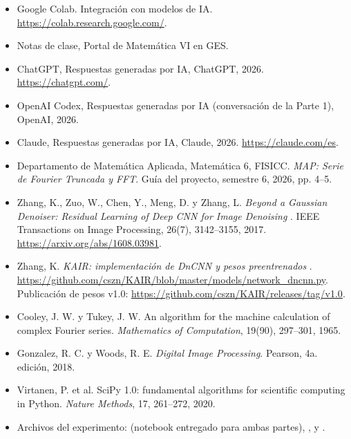 \documentclass[11pt]{article}
\begin{document}
\begin{itemize}

    \item Google Colab.
    Integración con modelos de IA.
    \url{https://colab.research.google.com/}.

    \item Notas de clase,
    Portal de Matemática VI en GES.

    \item ChatGPT,
    Respuestas generadas por IA,
    ChatGPT, 2026.
    \url{https://chatgpt.com/}.

    \item OpenAI Codex,
    Respuestas generadas por IA (conversación de la Parte 1),
    OpenAI, 2026.

    \item Claude,
    Respuestas generadas por IA,
    Claude, 2026.
    \url{https://claude.com/es}.

    \item Departamento de Matemática Aplicada,
    Matemática 6, FISICC.
    \textit{MAP: Serie de Fourier Truncada y FFT}.
    Guía del proyecto, semestre 6, 2026,
    pp. 4--5.

    \item Zhang, K., Zuo, W., Chen, Y.,
    Meng, D. y Zhang, L.
    \textit{
        Beyond a Gaussian Denoiser:
        Residual Learning of Deep CNN for Image Denoising
    }.
    IEEE Transactions on Image Processing,
    26(7), 3142--3155, 2017.
    \url{https://arxiv.org/abs/1608.03981}.

    \item Zhang, K.
    \textit{
        KAIR: implementación de DnCNN
        y pesos preentrenados
    }.
    \url{https://github.com/cszn/KAIR/blob/master/models/network_dncnn.py}.
    Publicación de pesos v1.0:
    \url{https://github.com/cszn/KAIR/releases/tag/v1.0}.

    \item Cooley, J. W. y Tukey, J. W.
    An algorithm for the machine calculation of complex Fourier series.
    \textit{Mathematics of Computation}, 19(90), 297--301, 1965.

    \item Gonzalez, R. C. y Woods, R. E.
    \textit{Digital Image Processing}. Pearson, 4a. edición, 2018.

    \item Virtanen, P. et al.
    SciPy 1.0: fundamental algorithms for scientific computing in Python.
    \textit{Nature Methods}, 17, 261--272, 2020.

    \item Archivos del experimento:
     (notebook entregado para ambas partes),
    ,
     y
    .

\end{itemize}
\end{document}
